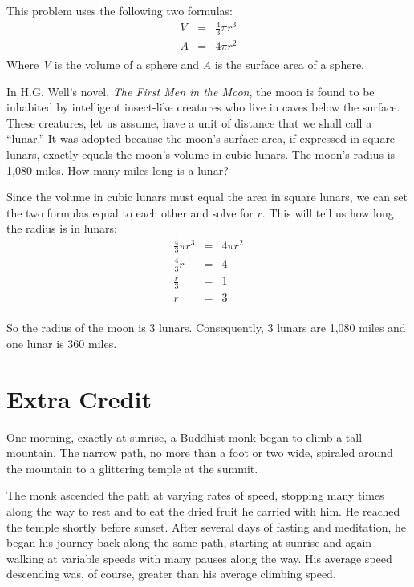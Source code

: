 \documentclass[fleqn,addpoints]{exam}
\begin{document}
\begin{questions}
\begin{solution}
\end{solution}
\question

This problem uses the following two formulas:
\begin{eqnarray*}
  V & = & \frac{4}{3} \pi r^3 \\
  A & = & 4 \pi r^2 \\
\end{eqnarray*}
Where {\em V} is the volume of a sphere and {\em A} is the surface area of a sphere.

In H.G. Well's novel, {\em The First Men in the Moon}, the moon is found to be inhabited by intelligent
insect-like creatures who live in caves below the surface.  These creatures, let us assume, have a unit of distance that we
shall call a ``lunar.''  It was adopted because the moon's surface area, if expressed in square lunars, exactly equals
the moon's volume in cubic lunars.  The moon's radius is 1,080 miles.  How many miles long is a lunar?

\begin{solution}
Since the volume in cubic lunars must equal the area in square lunars, we can set the two formulas equal to each other
and solve for $r$.  This will tell us how long the radius is in lunars:
\begin{eqnarray*}
  \frac{4}{3} \pi r^3 &=& 4 \pi r^2 \\
  \frac{4}{3} r &=& 4 \\
  \frac{r}{3} &=& 1 \\
  r &=& 3 \\
\end{eqnarray*}

So the radius of the moon is 3 lunars. Consequently, 3 lunars are 1,080 miles and one lunar is 360 miles.

\end{solution}

\pagebreak

\section{Extra Credit}

\question

One morning, exactly at sunrise, a Buddhist monk began to climb a tall mountain.  The narrow path, no more than a foot
or two wide, spiraled around the mountain to a glittering temple at the summit.

The monk ascended the path at varying rates of speed, stopping many times along the way to rest and to eat the dried
fruit he carried with him.  He reached the temple shortly before sunset.  After several days of fasting and meditation,
he began his journey back along the same path, starting at sunrise and again walking at variable speeds with many pauses
along the way.  His average speed descending was, of course, greater than his average climbing speed.


\end{questions}
\end{document}
